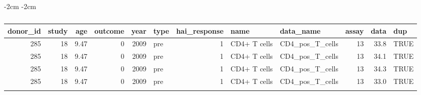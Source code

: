 \begin{table}
\addtolength{\leftskip} {-2cm} %
\addtolength{\rightskip} {-2cm} %
\begin{tabular}{rrrrrlrllrrl}
\toprule{}
donor\_id & study & age & outcome & year & type & hai\_response & name & data\_name & assay & data & dup\\
\midrule{}
285 & 18 & 9.47 & 0 & 2009 & pre & 1 & CD4+ T cells & CD4\_pos\_T\_cells & 13 & 33.8 & TRUE\\
285 & 18 & 9.47 & 0 & 2009 & pre & 1 & CD4+ T cells & CD4\_pos\_T\_cells & 13 & 34.1 & TRUE\\
285 & 18 & 9.47 & 0 & 2009 & pre & 1 & CD4+ T cells & CD4\_pos\_T\_cells & 13 & 34.3 & TRUE\\
285 & 18 & 9.47 & 0 & 2009 & pre & 1 & CD4+ T cells & CD4\_pos\_T\_cells & 13 & 33.0 & TRUE\\
\bottomrule{}
\end{tabular}
    \caption{}\label{tbl:exampleDuplicate}
\end{table}


